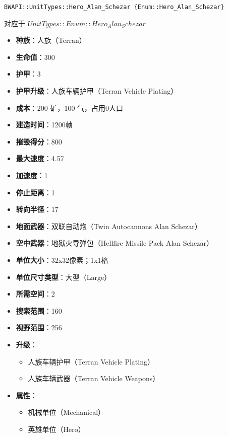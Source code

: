 \begin{tcolorbox}[colback=white, colframe=black!60!white, title=Hero\_Alan\_Schezar(), arc=0mm]
    \begin{verbatim}
BWAPI::UnitTypes::Hero_Alan_Schezar {Enum::Hero_Alan_Schezar}
    \end{verbatim}
    对应于  $ UnitTypes::Enum::Hero_Alan_Schezar $ 
    \begin{itemize}
        \item \textbf{种族}：人族（Terran）
        \item \textbf{生命值}：300
        \item \textbf{护甲}：3
        \item \textbf{护甲升级}：人族车辆护甲（Terran Vehicle Plating）
        \item \textbf{成本}：200 矿，100 气，占用0人口
        \item \textbf{建造时间}：1200帧
        \item \textbf{摧毁得分}：800
        \item \textbf{最大速度}：4.57
        \item \textbf{加速度}：1
        \item \textbf{停止距离}：1
        \item \textbf{转向半径}：17
        \item \textbf{地面武器}：双联自动炮（Twin Autocannons Alan Schezar）
        \item \textbf{空中武器}：地狱火导弹包（Hellfire Missile Pack Alan Schezar）
        \item \textbf{单位大小}：32x32像素；1x1格
        \item \textbf{单位尺寸类型}：大型（Large）
        \item \textbf{所需空间}：2
        \item \textbf{搜索范围}：160
        \item \textbf{视野范围}：256
        \item \textbf{升级}：
            \begin{itemize}
                \item 人族车辆护甲（Terran Vehicle Plating）
                \item 人族车辆武器（Terran Vehicle Weapons）
            \end{itemize}
        \item \textbf{属性}：
            \begin{itemize}
                \item 机械单位（Mechanical）
                \item 英雄单位（Hero）
            \end{itemize}
    \end{itemize}
\end{tcolorbox}

